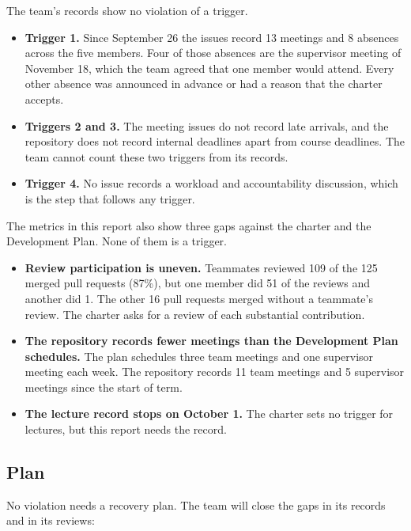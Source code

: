 \documentclass{article}
\begin{document}
The team's records show no violation of a trigger.

\begin{itemize}
    \item \textbf{Trigger 1.} Since September 26 the issues record 13
    meetings and 8 absences across the five members. Four of those absences
    are the supervisor meeting of November 18, which the team agreed that
    one member would attend. Every other absence was announced in advance
    or had a reason that the charter accepts.
    \item \textbf{Triggers 2 and 3.} The meeting issues do not record late
    arrivals, and the repository does not record internal deadlines apart
    from course deadlines. The team cannot count these two triggers from its
    records.
    \item \textbf{Trigger 4.} No issue records a workload and accountability
    discussion, which is the step that follows any trigger.
\end{itemize}

The metrics in this report also show three gaps against the charter and the
Development Plan. None of them is a trigger.

\begin{itemize}
    \item \textbf{Review participation is uneven.} Teammates reviewed 109 of
    the 125 merged pull requests (87\%), but one member did 51 of the
    reviews and another did 1. The other 16 pull requests merged without a
    teammate's review. The charter asks for a review of each substantial
    contribution.
    \item \textbf{The repository records fewer meetings than the Development
    Plan schedules.} The plan schedules three team meetings and one
    supervisor meeting each week. The repository records 11 team meetings
    and 5 supervisor meetings since the start of term.
    \item \textbf{The lecture record stops on October 1.} The charter sets
    no trigger for lectures, but this report needs the record.
\end{itemize}

\subsection*{Plan}

No violation needs a recovery plan. The team will close the gaps in its
records and in its reviews:
\end{document}
